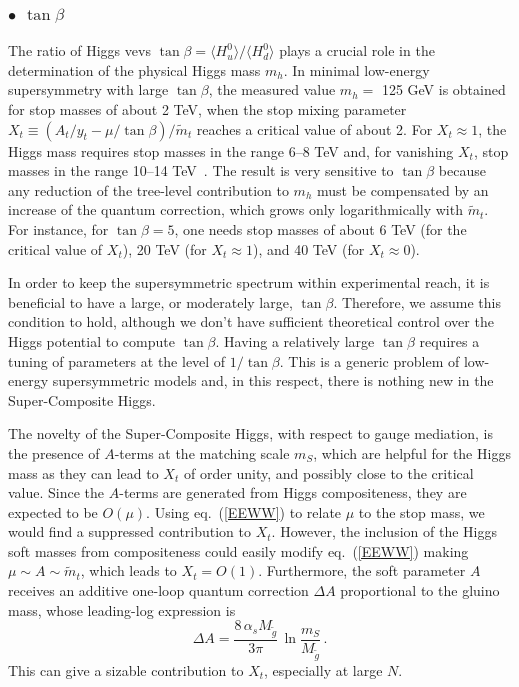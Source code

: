 \documentclass[a4paper,12pt]{article}
\newcommand{\beq}{\begin{equation}}
\newcommand{\eeq}{\end{equation}}
\def\eq#1{eq.~(\ref{#1})}
\def\eq#1{eq.~(\ref{#1})}
\def\mS{m_S}
\begin{document}
\boldmath
\subsubsection*{$\bullet$ $\tan \beta$}
\unboldmath

The ratio of Higgs vevs $\tan\beta = \langle H^0_u\rangle / \langle H^0_d\rangle$ plays a crucial role in the determination of the physical Higgs mass $m_h$. In minimal low-energy supersymmetry with large $\tan\beta$, the measured value $m_h=$ 125 GeV is obtained for stop masses of about 2 TeV, when the stop mixing parameter $X_t \equiv (A_t/y_t - \mu/\tan \beta )/{\tilde m}_t$ reaches a critical value
of about 2. For $X_t \approx 1$, the Higgs mass requires stop masses in the range 6--8 TeV and, for vanishing $X_t$, stop masses in the range 10--14 TeV~\cite{Slavich:2020zjv}. The result is very sensitive to $\tan\beta$ because any reduction of the tree-level contribution to $m_h$ must be compensated by an increase of the quantum correction, which grows only logarithmically with ${\tilde m}_t$. For instance, for $\tan\beta =5$, one needs stop masses of about 6 TeV (for the critical value of $X_t$),  20 TeV (for $X_t \approx 1$), and 40 TeV (for $X_t \approx 0$).

In order to keep the supersymmetric spectrum within experimental reach, it is beneficial to have a large, or moderately large, $\tan\beta$. Therefore, we assume this condition to hold, although we don't have sufficient theoretical control over the Higgs potential to compute $\tan\beta$. Having a relatively large $\tan\beta$ requires a tuning of parameters at the level of $1/\tan\beta$. This is a generic problem of low-energy supersymmetric models and, in this respect, there is nothing new in the Super-Composite Higgs. 

The novelty of the Super-Composite Higgs, with respect to gauge mediation, is the presence of $A$-terms at the matching scale $\mS$, which are helpful for the Higgs mass as they can lead to $X_t$ of order unity, and possibly close to the critical value. Since the $A$-terms are generated from Higgs compositeness, they are expected to be $O(\mu)$. Using \eq{EEWW} to relate $\mu$ to the stop mass, we would find a suppressed contribution to $X_t$. However, the inclusion of the Higgs soft masses from compositeness could easily modify \eq{EEWW} making $\mu \sim A \sim {\tilde m}_t$, which leads to $X_t = O(1)$. Furthermore, the soft parameter $A$ receives an additive one-loop quantum correction $\Delta A$ proportional to the gluino mass, whose leading-log expression is
\beq
\Delta A = \frac{8\,\alpha_sM_{\tilde g}}{3\pi}\, \ln \frac{\mS}{M_{\tilde g}} \, .
\eeq
This can give a sizable contribution to $X_t$, especially at large $N$.
\end{document}
